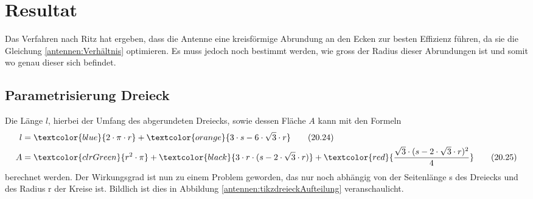 %
%
% 
%
%

\section{Resultat\label{antennen:resultat}}

Das Verfahren nach Ritz hat ergeben, dass die Antenne eine kreisförmige Abrundung an den Ecken 
zur besten Effizienz führen, da sie die Gleichung \eqref{antennen:Verhältnis} optimieren. 
Es muss jedoch noch bestimmt werden, wie gross der Radius dieser Abrundungen ist und somit wo
genau dieser sich befindet. 

\subsection{Parametrisierung Dreieck\label{antennen:param3eck}}
Die Länge $l$, hierbei der Umfang 
des abgerundeten Dreiecks, sowie dessen Fläche $A$ kann mit den Formeln
\begin{align}
	l &= \textcolor{blue}{2 \cdot \pi \cdot r} + \textcolor{orange}{3 \cdot s - 6 \cdot \sqrt{3} \cdot r} \tag{20.24} \label{antennen:Länge} \\
	A &= \textcolor{clrGreen}{r^2 \cdot \pi} + \textcolor{black}{3 \cdot r \cdot (s - 2 \cdot \sqrt{3} \cdot r)} + \textcolor{red}{\frac{\sqrt{3} \cdot (s - 2 \cdot \sqrt{3} \cdot r)^2}{4}} \tag{20.25} \label{antennen:Fläche}
\end{align}
\setcounter{equation}{25}
berechnet werden.
Der Wirkungsgrad ist nun zu einem Problem geworden, das nur noch abhängig von 
der Seitenlänge s des Dreiecks und des Radius r der Kreise ist. Bildlich ist dies 
in Abbildung \ref{antennen:tikzdreieckAufteilung} veranschaulicht.

